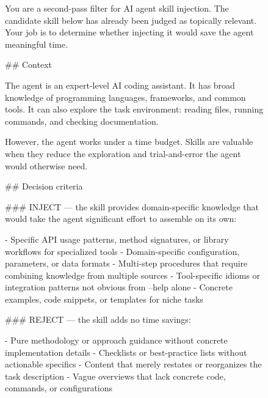 \documentclass[11pt]{article}
\begin{document}
\begin{figure}[!p]
\begin{tcolorbox}[title=Selector Specificity Prompt (Step~2), colback=gray!5, colframe=gray!50, fonttitle=\bfseries\small, fontupper=\scriptsize\ttfamily\raggedright]
You are a second-pass filter for AI agent skill injection. The candidate skill below has already been judged as topically relevant. Your job is to determine whether injecting it would save the agent meaningful time.\newline

\#\# Context\newline

The agent is an expert-level AI coding assistant. It has broad knowledge of programming languages, frameworks, and common tools. It can also explore the task environment: reading files, running commands, and checking documentation.\newline

However, the agent works under a time budget. Skills are valuable when they reduce the exploration and trial-and-error the agent would otherwise need.\newline

\#\# Decision criteria\newline

\#\#\# INJECT --- the skill provides domain-specific knowledge that would take the agent significant effort to assemble on its own:\newline

- Specific API usage patterns, method signatures, or library workflows for specialized tools\newline
- Domain-specific configuration, parameters, or data formats\newline
- Multi-step procedures that require combining knowledge from multiple sources\newline
- Tool-specific idioms or integration patterns not obvious from --help alone\newline
- Concrete examples, code snippets, or templates for niche tasks\newline

\#\#\# REJECT --- the skill adds no time savings:\newline

- Pure methodology or approach guidance without concrete implementation details\newline
- Checklists or best-practice lists without actionable specifics\newline
- Content that merely restates or reorganizes the task description\newline
- Vague overviews that lack concrete code, commands, or configurations\newline


\end{tcolorbox}
\end{figure}
\end{document}
